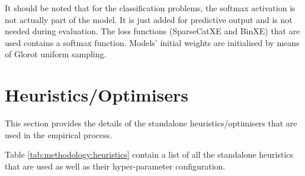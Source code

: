 It should be noted that for the classification problems, the softmax activation is not actually part of the model. It is just added for predictive output and is not needed during evaluation. The loss functions (\ac{SparseCatXE} and \ac{BinXE}) that are used contains a softmax function. Models' initial weights are initialised by means of Glorot uniform sampling.

\section{Heuristics/Optimisers}
\label{sec:methodology:heuristics}

This section provides the details of the standalone heuristics/optimisers that are used in the empirical process. 

Table \ref{tab:methodology:heuristics} contain a list of all the standalone heuristics that are used as well as their hyper-parameter configuration.

